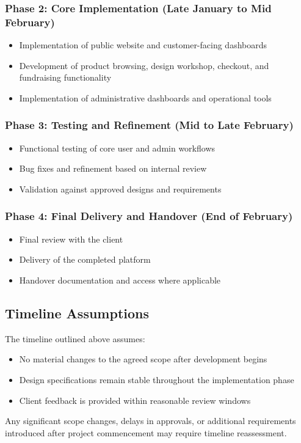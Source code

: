 \subsubsection*{Phase 2: Core Implementation (Late January to Mid February)}
\begin{itemize}[leftmargin=1.5em]
    \item Implementation of public website and customer-facing dashboards
    \item Development of product browsing, design workshop, checkout, and
    fundraising functionality
    \item Implementation of administrative dashboards and operational tools
\end{itemize}

\subsubsection*{Phase 3: Testing and Refinement (Mid to Late February)}
\begin{itemize}[leftmargin=1.5em]
    \item Functional testing of core user and admin workflows
    \item Bug fixes and refinement based on internal review
    \item Validation against approved designs and requirements
\end{itemize}

\subsubsection*{Phase 4: Final Delivery and Handover (End of February)}
\begin{itemize}[leftmargin=1.5em]
    \item Final review with the client
    \item Delivery of the completed platform
    \item Handover documentation and access where applicable
\end{itemize}

\subsection{Timeline Assumptions}

The timeline outlined above assumes:
\begin{itemize}[leftmargin=1.5em]
    \item No material changes to the agreed scope after development begins
    \item Design specifications remain stable throughout the implementation phase
    \item Client feedback is provided within reasonable review windows
\end{itemize}

Any significant scope changes, delays in approvals, or additional requirements
introduced after project commencement may require timeline reassessment.
